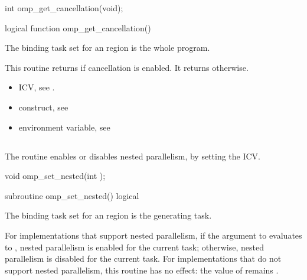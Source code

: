\format
\ccppspecificstart
\begin{boxedcode}
int omp\_get\_cancellation(void);
\end{boxedcode}
\ccppspecificend

\fortranspecificstart
\begin{boxedcode}
logical function omp\_get\_cancellation()
\end{boxedcode}
\fortranspecificend

\binding
The binding task set for an  region is the whole program.

\effect
This routine returns  if cancellation is enabled. It returns  otherwise.

\crossreferences
\begin{itemize}
\item {} ICV, see 
.

\item {} construct, see 

\item {} environment variable, see 
\end{itemize}









\subsection{}
\label{subsec:omp_set_nested}
\summary
The  routine enables or disables nested parallelism, by setting the 
 ICV. 

\format
\ccppspecificstart
\begin{boxedcode}
void omp\_set\_nested(int );
\end{boxedcode}
\ccppspecificend

\fortranspecificstart
\begin{boxedcode}
subroutine omp\_set\_nested()
logical 
\end{boxedcode}
\fortranspecificend

\binding
The binding task set for an  region is the generating task. 

\effect
For implementations that support nested parallelism, if the argument to 
 evaluates to , nested parallelism is enabled for the current task; 
otherwise, nested parallelism is disabled for the current task. For implementations that 
do not support nested parallelism, this routine has no effect: the value of  
remains .

